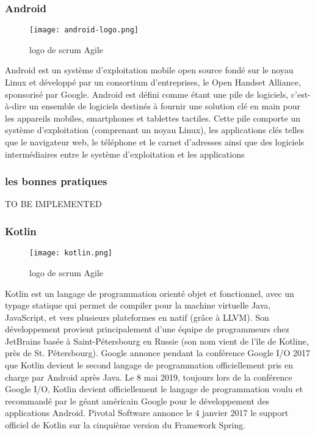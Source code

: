 \subsubsection{Android}
\begin{wrapfigure}{r}{0.25\textwidth} 
    \centering
    \texttt{[image: android-logo.png]}
    \caption{logo de scrum Agile}
\end{wrapfigure}
Android est un système d'exploitation mobile open source fondé sur le noyau Linux et développé par un consortium d'entreprises, le Open Handset Alliance, sponsorisé par Google. 
Android est défini comme étant une pile de logiciels, c'est-à-dire un ensemble de logiciels destinés à fournir une solution clé en main pour les appareils mobiles, smartphones et tablettes tactiles. Cette pile comporte un système d'exploitation (comprenant un noyau Linux), les applications clés telles que le navigateur web, le téléphone et le carnet d'adresses ainsi que des logiciels intermédiaires entre le système d'exploitation et les applications
\cite*{wiki:Android}
\subsubsection{les bonnes pratiques}
TO BE IMPLEMENTED
\subsubsection{Kotlin}
\begin{wrapfigure}{r}{0.25\textwidth} 
    \centering
    \texttt{[image: kotlin.png]}
    \caption{logo de scrum Agile}
\end{wrapfigure}
Kotlin est un langage de programmation orienté objet et fonctionnel, avec un typage statique qui permet de compiler pour la machine virtuelle Java, JavaScript, et vers plusieurs plateformes en natif (grâce à LLVM). Son développement provient principalement d'une équipe de programmeurs chez JetBrains basée à Saint-Pétersbourg en Russie (son nom vient de l'île de Kotline, près de St. Pétersbourg).
Google annonce pendant la conférence Google I/O 2017 que Kotlin devient le second langage de programmation officiellement pris en charge par Android après Java. Le 8 mai 2019, toujours lors de la conférence Google I/O, Kotlin devient officiellement le langage de programmation voulu et recommandé par le géant américain Google pour le développement des applications Android.
Pivotal Software annonce le 4 janvier 2017 le support officiel de Kotlin sur la cinquième version du Framework Spring. 
\cite*{wiki:Kotlin}
